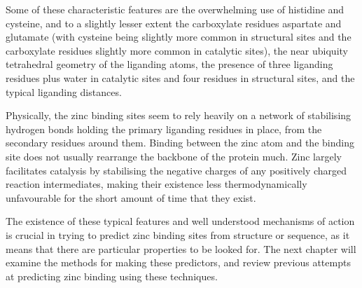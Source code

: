 
Some of these characteristic features are the overwhelming use of histidine and cysteine, and to a slightly lesser extent the carboxylate residues aspartate and glutamate (with cysteine being slightly more common in structural sites and the carboxylate residues slightly more common in catalytic sites), the near ubiquity tetrahedral geometry of the liganding atoms, the presence of three liganding residues plus water in catalytic sites and four residues in structural sites, and the typical liganding distances.

Physically, the zinc binding sites seem to rely heavily on a network of stabilising hydrogen bonds holding the primary liganding residues in place, from the secondary residues around them. Binding between the zinc atom and the binding site does not usually rearrange the backbone of the protein much. Zinc largely facilitates catalysis by stabilising the negative charges of any positively charged reaction intermediates, making their existence less thermodynamically unfavourable for the short amount of time that they exist.

The existence of these typical features and well understood mechanisms of action is crucial in trying to predict zinc binding sites from structure or sequence, as it means that there are particular properties to be looked for. The next chapter will examine the methods for making these predictors, and review previous attempts at predicting zinc binding using these techniques.


